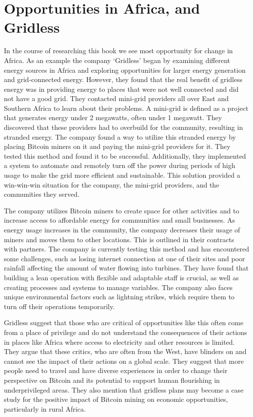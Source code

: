 \section{Opportunities in Africa, and Gridless}
In the course of researching this book we see most opportunity for change in Africa. As an example the company `Gridless' began by examining different energy sources in Africa and exploring opportunities for larger energy generation and grid-connected energy. However, they found that the real benefit of gridless energy was in providing energy to places that were not well connected and did not have a good grid. They contacted mini-grid providers all over East and Southern Africa to learn about their problems. A mini-grid is defined as a project that generates energy under 2 megawatts, often under 1 megawatt. They discovered that these providers had to overbuild for the community, resulting in stranded energy. The company found a way to utilize this stranded energy by placing Bitcoin miners on it and paying the mini-grid providers for it. They tested this method and found it to be successful. Additionally, they implemented a system to automate and remotely turn off the power during periods of high usage to make the grid more efficient and sustainable. This solution provided a win-win-win situation for the company, the mini-grid providers, and the communities they served.\par
The company utilizes Bitcoin miners to create space for other activities and to increase access to affordable energy for communities and small businesses. As energy usage increases in the community, the company decreases their usage of miners and moves them to other locations. This is outlined in their contracts with partners. The company is currently testing this method and has encountered some challenges, such as losing internet connection at one of their sites and poor rainfall affecting the amount of water flowing into turbines. They have found that building a lean operation with flexible and adaptable staff is crucial, as well as creating processes and systems to manage variables. The company also faces unique environmental factors such as lightning strikes, which require them to turn off their operations temporarily.\par
Gridless suggest that those who are critical of opportunities like this often come from a place of privilege and do not understand the consequences of their actions in places like Africa where access to electricity and other resources is limited. They argue that these critics, who are often from the West, have blinders on and cannot see the impact of their actions on a global scale. They suggest that more people need to travel and have diverse experiences in order to change their perspective on Bitcoin and its potential to support human flourishing in underprivileged areas. They also mention that gridless plans may become a case study for the positive impact of Bitcoin mining on economic opportunities, particularly in rural Africa.